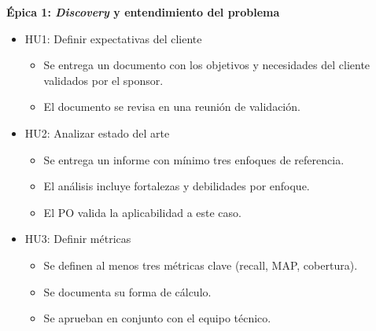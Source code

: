 \documentclass[
11pt, %
]{charter}
\begin{document}
\textbf{\'Epica 1: \textit{Discovery} y entendimiento del problema}
\begin{itemize}
  \item HU1: Definir expectativas del cliente
  \begin{itemize}
    \item Se entrega un documento con los objetivos y necesidades del cliente validados por el sponsor.
    \item El documento se revisa en una reunión de validación.
  \end{itemize}
  \item HU2: Analizar estado del arte
  \begin{itemize}
    \item Se entrega un informe con mínimo tres enfoques de referencia.
    \item El análisis incluye fortalezas y debilidades por enfoque.
    \item El PO valida la aplicabilidad a este caso.
  \end{itemize}
  \item HU3: Definir métricas
  \begin{itemize}
    \item Se definen al menos tres métricas clave (recall, MAP, cobertura).
    \item Se documenta su forma de cálculo.
    \item Se aprueban en conjunto con el equipo técnico.
  \end{itemize}
\end{itemize}
\end{document}
